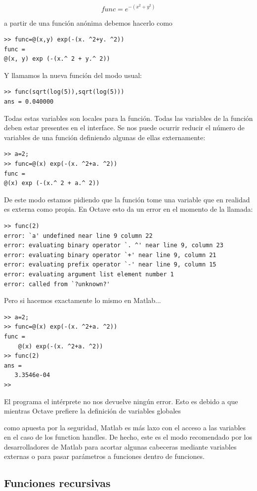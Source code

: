 $$func=e^{-(x^{2}+y^{2})}$$

a partir de una función anónima debemos hacerlo como

\begin{verbatim}
>> func=@(x,y) exp(-(x. ^2+y. ^2)) 
func =
@(x, y) exp (-(x.^ 2 + y.^ 2)) 
\end{verbatim}
Y llamamos la nueva función del modo usual:

\begin{verbatim}
>> func(sqrt(log(5)),sqrt(log(5)))
ans = 0.040000 
\end{verbatim}
Todas estas variables son locales para la función. Todas las variables
de la función deben estar presentes en el interface. Se nos puede
ocurrir reducir el número de variables de una función definiendo
algunas de ellas externamente:

\begin{verbatim}
>> a=2;
>> func=@(x) exp(-(x. ^2+a. ^2)) 
func =
@(x) exp (-(x.^ 2 + a.^ 2))
\end{verbatim}
De este modo estamos pidiendo que la función tome una variable que en
realidad es externa como propia. En Octave esto da un error en el
momento de la llamada:

\begin{verbatim}
>> func(2)
error: `a' undefined near line 9 column 22
error: evaluating binary operator `. ^' near line 9, column 23
error: evaluating binary operator `+' near line 9, column 21
error: evaluating prefix operator `-' near line 9, column 15
error: evaluating argument list element number 1
error: called from `?unknown?'
\end{verbatim}

Pero si hacemos exactamente lo mismo en Matlab...

\begin{verbatim}
>> a=2;
>> func=@(x) exp(-(x. ^2+a. ^2))
func =
    @(x) exp(-(x. ^2+a. ^2))
>> func(2)
ans =
   3.3546e-04
>>
\end{verbatim}
El programa el intérprete no nos devuelve ningún error. Esto es debido
a que mientras Octave prefiere la definición de variables globales

como apuesta por la seguridad, Matlab es más laxo con el acceso a las
variables en el caso de los function handles. De hecho, este es el
modo recomendado por los desarrolladores de Matlab para acortar
algunas cabeceras mediante variables externas o para pasar parámetros
a funciones dentro de funciones.


\subsection{Funciones recursivas}

